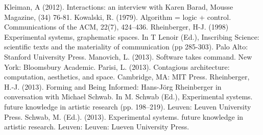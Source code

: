 Kleiman, A (2012). Interactions: an interview with Karen Barad, Mousse Magazine, (34) 76-81.
Kowalski, R. (1979). Algorithm = logic + control. Communications of the ACM, 22(7), 424–436.
Rheinberger, H-J. (1998) Experimental systems, graphematic spaces. In T Lenoir (Ed.), Inscribing Science: scientific texts and the materiality of communication (pp 285-303). Palo Alto: Stanford University Press.
Manovich, L. (2013). Software takes command. New York: Bloomsbury Academic.
Parisi, L. (2013). Contagious architecture: computation, aesthetics, and space. Cambridge, MA:
MIT Press.
Rheinberger, H.-J. (2013). Forming and Being Informed: Hans-Jörg Rheinberger in conversation with Michael Schwab. In M. Schwab (Ed.), Experimental systems. future knowledge in artistic research (pp. 198–219). Leuven: Leuven University Press.
Schwab, M. (Ed.). (2013). Experimental systems. future knowledge in artistic research. Leuven: Leuven: Lueven University Press.

